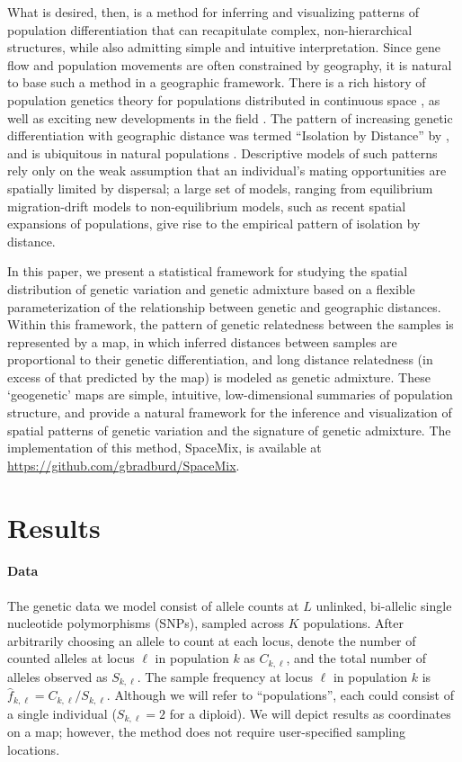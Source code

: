 \documentclass[12pt]{article}
\begin{document}
What is desired, then, is a method for inferring and visualizing patterns of population differentiation that can recapitulate complex, non-hierarchical structures, while also admitting simple and intuitive interpretation.  
Since gene flow and population movements are often constrained by geography,
it is natural to base such a method in a geographic framework.
There is a rich history of population genetics theory for populations distributed in continuous space \citep{Malecot1975, nagylaki1978diffusion, felsensten1975pain, barton-depaulis-etheridge}, as well as exciting new developments in the field \citep[e.g.][]{Petkova_2014_EEMS}.
The pattern of increasing genetic differentiation with geographic distance 
was termed ``Isolation by Distance'' by \citet{Wright1943},
and is ubiquitous in natural populations \citep{meirmans2012}.
Descriptive models of such patterns rely only on the weak assumption that an individual's mating opportunities are spatially limited by dispersal; 
a large set of models, ranging from equilibrium migration-drift models to non-equilibrium models, such as recent spatial expansions of populations, 
give rise to the empirical pattern of isolation by distance.

In this paper, we present a statistical framework for studying the spatial distribution of genetic variation and genetic admixture based on a flexible parameterization
of the relationship between genetic and geographic distances.
Within this framework, the pattern of genetic relatedness between the samples is represented by a map, 
in which inferred distances between samples are proportional to their genetic differentiation, 
and long distance relatedness (in excess of that predicted by the map) is modeled as genetic admixture.
These `geogenetic'  maps are simple, intuitive, low-dimensional summaries of population structure, 
and provide a natural framework for the inference and visualization of spatial patterns of genetic variation and the signature of genetic admixture.  
The implementation of this method, SpaceMix, is available at \href{https://github.com/gbradburd/SpaceMix}{https://github.com/gbradburd/SpaceMix}.


\section*{Results}

\paragraph{Data}
The genetic data we model consist of allele counts
at $L$ unlinked, bi-allelic single nucleotide polymorphisms (SNPs), sampled across $K$ populations.
After arbitrarily choosing an allele to count at each locus, 
denote the number of counted alleles at locus $\ell$ in population $k$ as $C_{k,\ell}$,
and the total number of alleles observed as $S_{k,\ell}$.
The sample frequency at locus $\ell$ in population $k$ is $\hat{f}_{k,\ell} = C_{k,\ell}/S_{k,\ell}$.  
Although we will refer to ``populations'', each could consist of a single individual ($S_{k,\ell}=2$ for a diploid).
We will depict results as coordinates on a map; however, the method does not require user-specified sampling locations.
\end{document}

